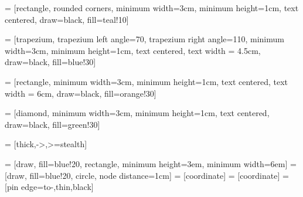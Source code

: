  = [rectangle, rounded corners, minimum width=3cm, minimum height=1cm, text centered, draw=black, fill=teal!10]

 = [trapezium, trapezium left angle=70, trapezium right angle=110, minimum width=3cm, minimum height=1cm, text centered, text width = 4.5cm, draw=black, fill=blue!30]

 = [rectangle, minimum width=3cm, minimum height=1cm, text centered, text width = 6cm, draw=black, fill=orange!30]

 = [diamond, minimum width=3cm, minimum height=1cm, text centered, draw=black, fill=green!30]

 = [thick,->,>=stealth]

 = [draw, fill=blue!20, rectangle, 
    minimum height=3em, minimum width=6em]
 = [draw, fill=blue!20, circle, node distance=1cm]
 = [coordinate]
 = [coordinate]
 = [pin edge={to-,thin,black}]





